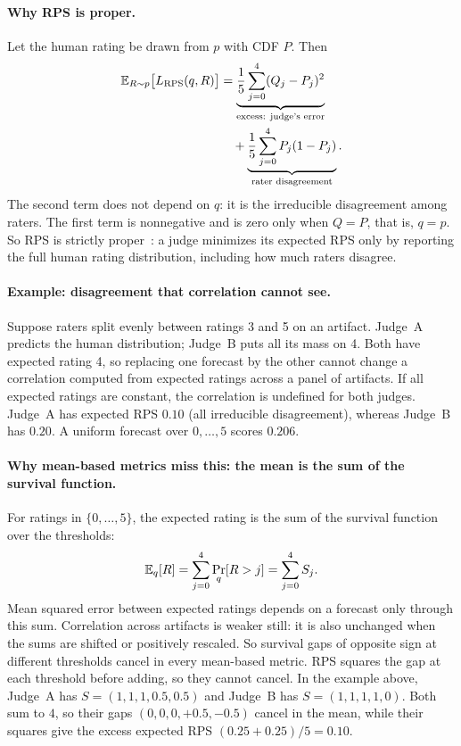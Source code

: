 \paragraph{Why RPS is proper.}
Let the human rating be drawn from $p$ with CDF $P$.
Then
\begin{align}
\mathbb{E}_{R\sim p}\bigl[L_{\rm RPS}(q,R)\bigr]
&=\underbrace{\frac{1}{5}\sum_{j=0}^{4}(Q_j-P_j)^2}_{\text{excess: judge's error}}\nonumber\\
&\quad+\underbrace{\frac{1}{5}\sum_{j=0}^{4}P_j(1-P_j)}_{\text{rater disagreement}}.
\label{eq:rps-decomposition}
\end{align}
The second term does not depend on $q$: it is the irreducible disagreement among raters.
The first term is nonnegative and is zero only when $Q=P$, that is, $q=p$.
So RPS is strictly proper~\citep{gneiting2007strictly}: a judge minimizes its expected RPS only by reporting the full human rating distribution, including how much raters disagree.

\paragraph{Example: disagreement that correlation cannot see.}
Suppose raters split evenly between ratings 3 and 5 on an artifact.
Judge~A predicts the human distribution; Judge~B puts all its mass on 4.
Both have expected rating 4, so replacing one forecast by the other cannot change a correlation computed from expected ratings across a panel of artifacts.
If all expected ratings are constant, the correlation is undefined for both judges.
Judge~A has expected RPS $0.10$ (all irreducible disagreement), whereas Judge~B has $0.20$.
A uniform forecast over $0,\dots,5$ scores $0.206$.

\paragraph{Why mean-based metrics miss this: the mean is the sum of the survival function.}
For ratings in $\{0,\dots,5\}$, the expected rating is the sum of the survival function over the thresholds:
\begin{equation}
\mathbb{E}_q[R]=\sum_{j=0}^{4}\Pr_q[R>j]=\sum_{j=0}^{4}S_j.
\label{eq:mean-survival}
\end{equation}
Mean squared error between expected ratings depends on a forecast only through this sum.
Correlation across artifacts is weaker still: it is also unchanged when the sums are shifted or positively rescaled.
So survival gaps of opposite sign at different thresholds cancel in every mean-based metric.
RPS squares the gap at each threshold before adding, so they cannot cancel.
In the example above, Judge~A has $S=(1,1,1,0.5,0.5)$ and Judge~B has $S=(1,1,1,1,0)$.
Both sum to $4$, so their gaps $(0,0,0,+0.5,-0.5)$ cancel in the mean, while their squares give the excess expected RPS $(0.25+0.25)/5=0.10$.

